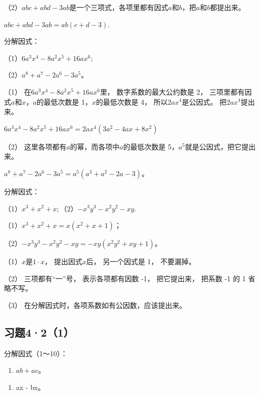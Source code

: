 （2）\(abc + abd - 3ab\)是一个三项式，各项里都有因式\(a\)和\(b\)，把\(a\)和\(b\)都提出来。

\(abc + abd - 3ab = ab (c + d - 3).\)

 分解因式：

（1）\(6a^{3}x^{4} - 8a^{2}x^{5} + 16ax^{6};\)

（2）\(a^8 + a^7 - 2a^6 - 3a^5\)。

 （1） 在\(6a^{3}x^{4} - 8a^{2}x^{5} + 16ax^{6}\)里，
数字系数的最大公约数是 2， 三项里都有因式\(a\)和\(x\)，\(a\)的最低次数是
1，\(x\)的最低次数是 4， 所以\(2ax^{4}\)是公因式。 把\(2ax^{4}\)提出来。

\(6a^{3}x^{4} - 8a^{2}x^{5} + 16ax^{6} = 2ax^{4}(3a^{2} - 4ax + 8x^{2})\)

 （2） 这里各项都有\(a\)的幂，而各项中\(a\)的最低次数是
5，\(a^5\)就是公因式，把它提出来。

\(a^8 + a^7 - 2a^6 - 3a^5 = a^5 (a^3 + a^2 - 2a - 3)\)。

 分解因式：

（1）\(x^{3} + x^{2} + x;\)（2）\(-x^{3}y^{3} - x^{2}y^{2} - xy.\)

 （1）\(x^{3} + x^{2} + x = x(x^{2} + x + 1)\)；

（2）\(-x^{3}y^{3} - x^{2}y^{2} - xy = -xy(x^{2}y^{2} + xy + 1)\)。

 （1）\(x\)是\(1 \cdot x\)， 提出因式\(x\)后，
另一个因式是 1， 不要漏掉。

（2） 三项都有``一''号， 表示各项都有因数 -1， 把它提出来， 把系数 -1 的
1 省略不写。

（3） 在分解因式时，各项系数如有公因数，应该提出来。

\subsection{习题4·2（1）}

分解因式（1～10）：

\begin{enumerate}[start=1]
\item
  \(ab + ac\)。
\end{enumerate}

\begin{enumerate}[start=2]
\item
  ax - bx。
\end{enumerate}

